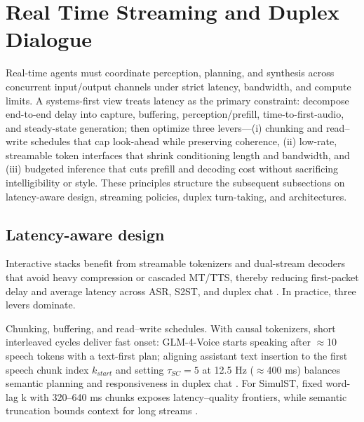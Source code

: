 \documentclass{article}
\begin{document}
\section{Real Time Streaming and Duplex Dialogue} \label{sec:Real Time Streaming and Duplex Dialogue}

\noindent Real-time agents must coordinate perception, planning, and synthesis across concurrent input/output channels under strict latency, bandwidth, and compute limits. A systems-first view treats latency as the primary constraint: decompose end-to-end delay into capture, buffering, perception/prefill, time-to-first-audio, and steady-state generation; then optimize three levers---(i) chunking and read--write schedules that cap look-ahead while preserving coherence, (ii) low-rate, streamable token interfaces that shrink conditioning length and bandwidth, and (iii) budgeted inference that cuts prefill and decoding cost without sacrificing intelligibility or style. These principles structure the subsequent subsections on latency-aware design, streaming policies, duplex turn-taking, and architectures.



\subsection{Latency-aware design} \label{subsec:Latency-aware design}

Interactive stacks benefit from streamable tokenizers and dual-stream decoders that avoid heavy compression or cascaded MT/TTS, thereby reducing first-packet delay and average latency across ASR, S2ST, and duplex chat \cite{li2025continuousspeechtokenizertext,har-tuv2025pastphoneticacousticspeechtokenizer,bai2025dmelspeechtokenizationmadesimple,zhao2024textlessstreamingspeechtranslationsemant,sheng2025syncspeechlowlatencyefficientdualstreamt}. In practice, three levers dominate.

Chunking, buffering, and read--write schedules. With causal tokenizers, short interleaved cycles deliver fast onset: GLM-4-Voice starts speaking after $\approx$10 speech tokens with a text-first plan; aligning assistant text insertion to the first speech chunk index $k_{start}$ and setting $\tau_{SC}=5$ at 12.5 Hz ($\approx$400 ms) balances semantic planning and responsiveness in duplex chat \cite{zeng2024glm4voicetowardsintelligenthumanlikeends,cui2025thinkbeforeyoutalkenhancingmeaningfuldia}. For SimulST, fixed word-lag k with 320--640 ms chunks exposes latency--quality frontiers, while semantic truncation bounds context for long streams \cite{guo2025streamuniachievingstreamingspeechtransla}.
\end{document}
